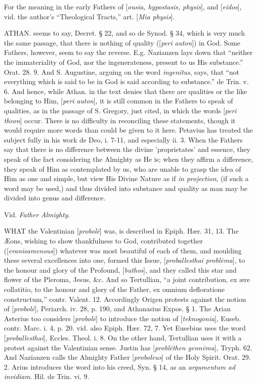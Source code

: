 For the meaning in the early Fathers of [\emph{ousia,
hypostasis, physis}], and [\emph{eidos}], vid. the author's ``Theological
Tracts,'' art. [\emph{Mia physis}].

\xsection{[Peribole]}

ATHAN.
seems to say, Decret. § 22, and so de Synod. § 34, which is very
much the same passage, that there is nothing of quality ([\emph{peri
auton}]) in God. Some Fathers, however, seem to say the reverse.
E.g. Nazianzen lays down that ``neither the immateriality of God, nor
the ingenerateness, present to us His substance.'' Orat. 28. 9. And S.
Augustine, arguing on the word \emph{ingenitus}, says, that ``not
everything which is said to be in God is said according to substance.''
de Trin. v. 6. And hence, while Athan. in the text denies that there
are qualities or the like belonging to Him, [\emph{peri auton}], it is
still common in the Fathers to speak of qualities, as in the passage
of S. Gregory, just cited, in which the words [\emph{peri theon}]
occur. There is no difficulty in reconciling these statements, though
it would require more words than could be given to it here. Petavius
has treated the subject fully in his work de Deo, i. 7-11, and
especially ii. 3. When the Fathers say that there is no difference
between the divine 'proprietates' and essence, they speak of the fact
considering the Almighty as He is; when they affirm a difference, they
speak of Him as contemplated by us, who are unable to grasp the idea
of Him as one and simple, but view His Divine Nature as if \emph{in
projection}, (if such a word may be used,) and thus divided into
substance and quality as man may be divided into genus and difference.

\xsection{[Pege]}

Vid. \emph{Father Almighty}.

\xsection{[Probole]}

WHAT
the Valentinian [\emph{probol\={e}}] was, is described in Epiph. Hær.
31, 13. The Æons, wishing to show thankfulness to God, contributed
together ([\emph{eranisamenous}]) whatever was most beautiful of each
of them, and moulding these several excellences into one, formed this
Issue, [\emph{proballesthai probl\={e}ma}], to the honour and glory
of the Profound, [\emph{buthos}], and they called this star and flower
of the Pleroma, Jesus, \&c. And so Tertullian, ``a joint
contribution, ex ære collatitio, to the honour and glory of the
Father, ex omnium defloratione constructum,'' contr. Valent. 12.
Accordingly Origen protests against the notion of [\emph{probol\={e}}],
Periarch. iv. 28, p. 190, and Athanasius Expos. § 1. The Arian
Asterius too considers [\emph{probol\={e}}] to introduce the notion
of [\emph{teknogonia}], Euseb. contr. Marc. i. 4, p. 20. vid. also
Epiph. Hær. 72, 7. Yet Eusebius uses the word [\emph{proballesthai}],
Eccles. Theol. i. 8. On the other hand, Tertullian uses it with a
protest against the Valentinian sense. Justin has [\emph{probl\={e}then
genn\={e}ma}], Tryph. 62. And Nazianzen calls the Almighty
Father [\emph{proboleus}] of the Holy Spirit. Orat. 29. 2. Arius
introduces the word into his creed, Syn. § 14, as an \emph{argumentum ad
invidiam}. Hil. de Trin. vi. 9.

